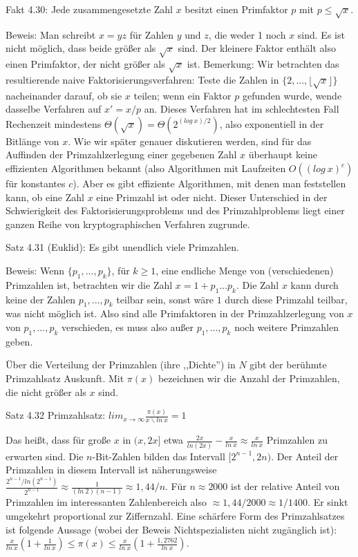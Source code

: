 \documentclass[a4paper]{article}
\begin{document}
\begin{multicols}{3}
Fakt 4.30: Jede zusammengesetzte Zahl $x$ besitzt einen Primfaktor $p$ mit $p\leq\sqrt{x}$. 

Beweis: Man schreibt $x=yz$ für Zahlen $y$ und $z$, die weder 1 noch $x$ sind. Es ist nicht möglich, dass beide größer als $\sqrt{x}$ sind. Der kleinere Faktor enthält also einen Primfaktor, der nicht größer als $\sqrt{x}$ ist. 
Bemerkung: Wir betrachten das resultierende naive Faktorisierungsverfahren: Teste die Zahlen in $\{2,...,\lfloor\sqrt{x}\rfloor\}$ nacheinander darauf, ob sie $x$ teilen; wenn ein Faktor $p$ gefunden wurde, wende dasselbe Verfahren auf $x'=x/p$ an. Dieses Verfahren hat im schlechtesten Fall Rechenzeit mindestens $Θ(\sqrt{x}) = Θ(2^{(log\ x)/ 2})$, also exponentiell in der Bitlänge von $x$. Wie wir später genauer diskutieren werden, sind für das Auffinden der Primzahlzerlegung einer gegebenen Zahl $x$ überhaupt keine effizienten Algorithmen bekannt (also Algorithmen mit Laufzeiten $O((log\ x)^c)$ für konstantes $c$). Aber es gibt effiziente Algorithmen, mit denen man feststellen kann, ob eine Zahl $x$ eine Primzahl ist oder nicht. Dieser Unterschied in der Schwierigkeit des Faktorisierungsproblems und des Primzahlproblems liegt einer ganzen Reihe von kryptographischen Verfahren zugrunde.

Satz 4.31 (Euklid): Es gibt unendlich viele Primzahlen.

Beweis: Wenn $\{p_1,...,p_k\}$, für $k\geq 1$, eine endliche Menge von (verschiedenen) Primzahlen ist, betrachten wir die Zahl $x=1+p_1...p_k$. Die Zahl $x$ kann durch keine der Zahlen $p_1,...,p_k$ teilbar sein, sonst wäre $1$ durch diese Primzahl teilbar, was nicht möglich ist. Also sind alle Primfaktoren in der Primzahlzerlegung von $x$ von $p_1,...,p_k$ verschieden, es muss also außer $p_1,...,p_k$ noch weitere Primzahlen geben. 

Über die Verteilung der Primzahlen (ihre ,,Dichte'') in $N$ gibt der berühmte Primzahlsatz Auskunft. Mit $\pi(x)$ bezeichnen wir die Anzahl der Primzahlen, die nicht größer als $x$ sind.

Satz 4.32 Primzahlsatz: $lim_{x\rightarrow \infty} \frac{\pi(x)}{x\backslash ln\ x}= 1$  

Das heißt, dass für große $x$ in $(x,2x]$ etwa $\frac{2x}{ln(2x)}-\frac{x}{ln\ x}\approx \frac{x}{ln\ x}$ Primzahlen zu erwarten sind. Die $n$-Bit-Zahlen bilden das Intervall $[2^{n-1} , 2n)$. Der Anteil der Primzahlen in diesem Intervall ist näherungsweise $\frac{2^{n-1} /ln(2^{n-1})}{2^{n-1}}\approx \frac{1}{(ln\ 2)(n-1)}\approx 1,44/n$.
Für $n\approx 2000$ ist der relative Anteil von Primzahlen im interessanten Zahlenbereich also $\approx 1,44/2000\approx 1/1400$. Er sinkt umgekehrt proportional zur Ziffernzahl. 
Eine schärfere Form des Primzahlsatzes ist folgende Aussage (wobei der Beweis Nichtspezialisten nicht zugänglich ist): $\frac{x}{ln\ x}(1+\frac{1}{ln\ x})\leq \pi(x)\leq \frac{x}{ln\ x}(1+\frac{1,2762}{ln\ x})$. 


\end{multicols}
\end{document}
